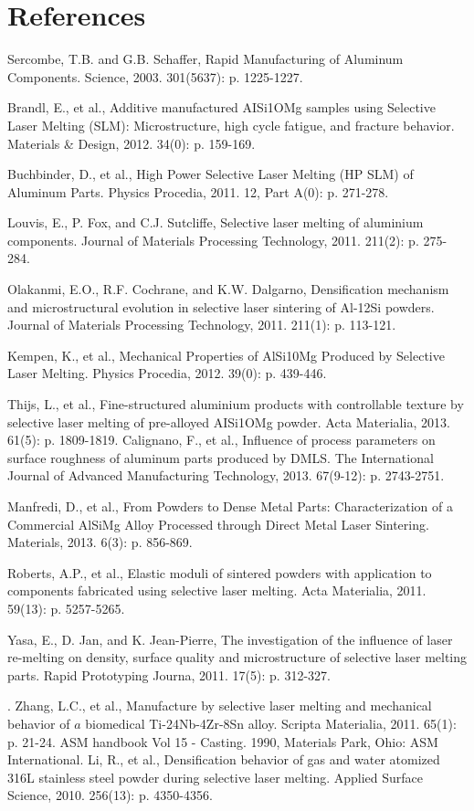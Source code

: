 \documentclass[10pt]{article}
\begin{document}
\section*{References}
Sercombe, T.B. and G.B. Schaffer, Rapid Manufacturing of Aluminum Components. Science, 2003. 301(5637): p. 1225-1227.

Brandl, E., et al., Additive manufactured AISi1OMg samples using Selective Laser Melting (SLM): Microstructure, high cycle fatigue, and fracture behavior. Materials \& Design, 2012. 34(0): p. 159-169.

Buchbinder, D., et al., High Power Selective Laser Melting (HP SLM) of Aluminum Parts. Physics Procedia, 2011. 12, Part A(0): p. 271-278.

Louvis, E., P. Fox, and C.J. Sutcliffe, Selective laser melting of aluminium components. Journal of Materials Processing Technology, 2011. 211(2): p. 275-284.

Olakanmi, E.O., R.F. Cochrane, and K.W. Dalgarno, Densification mechanism and microstructural evolution in selective laser sintering of Al-12Si powders. Journal of Materials Processing Technology, 2011. 211(1): p. 113-121.

Kempen, K., et al., Mechanical Properties of AlSi10Mg Produced by Selective Laser Melting. Physics Procedia, 2012. 39(0): p. 439-446.

Thijs, L., et al., Fine-structured aluminium products with controllable texture by selective laser melting of pre-alloyed AISi1OMg powder. Acta Materialia, 2013. 61(5): p. 1809-1819. Calignano, F., et al., Influence of process parameters on surface roughness of aluminum parts produced by DMLS. The International Journal of Advanced Manufacturing Technology, 2013. 67(9-12): p. 2743-2751.

Manfredi, D., et al., From Powders to Dense Metal Parts: Characterization of a Commercial AlSiMg Alloy Processed through Direct Metal Laser Sintering. Materials, 2013. 6(3): p. 856-869.

Roberts, A.P., et al., Elastic moduli of sintered powders with application to components fabricated using selective laser melting. Acta Materialia, 2011. 59(13): p. 5257-5265.

Yasa, E., D. Jan, and K. Jean-Pierre, The investigation of the influence of laser re-melting on density, surface quality and microstructure of selective laser melting parts. Rapid Prototyping Journa, 2011. 17(5): p. 312-327.

. Zhang, L.C., et al., Manufacture by selective laser melting and mechanical behavior of $a$ biomedical Ti-24Nb-4Zr-8Sn alloy. Scripta Materialia, 2011. 65(1): p. 21-24. ASM handbook Vol 15 - Casting. 1990, Materials Park, Ohio: ASM International. Li, R., et al., Densification behavior of gas and water atomized 316L stainless steel powder during selective laser melting. Applied Surface Science, 2010. 256(13): p. 4350-4356.
\end{document}
